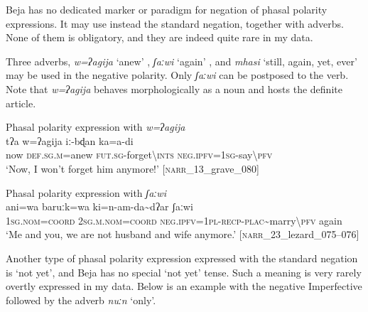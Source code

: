 \documentclass[output=paper,colorlinks,citecolor=brown]{langscibook}
\begin{document}

Beja has no dedicated marker or paradigm for negation of phasal polarity expressions. It may use instead the standard negation, together with adverbs. None of them is obligatory, and they are indeed quite rare in my data.

Three adverbs, \textit{w=ʔagija} ‘anew’ , \textit{ʃaːwi} ‘again’ , and \textit{mhasi} ‘still, again, yet, ever’  may be used in the negative polarity. Only \textit{ʃaːwi} can be postposed to the verb. Note that \textit{w=ʔagija} behaves morphologically as a noun and hosts the definite article.

\ea\label{ex:beja:4}
Phasal polarity expression with \textit{w=ʔagija} \\
    \gll tʔa w=ʔagija iː-bɖan ka=a-di\\
         now \textsc{def.sg.m}=anew \textsc{fut.sg}{}-forget{\textbackslash}\textsc{ints} \textsc{neg.ipfv=1sg-}say{\textbackslash}\textsc{pfv}\\
    \glt `Now, I won’t forget him anymore!' [\textsc{narr}\_13\_grave\_080]
\z 

\ea\label{ex:beja:5}
{  Phasal polarity expression with \textit{ʃaːwi}}\\
    \gll ani=wa baruːk=wa ki=n-am-da{\textasciitilde}dʔar ʃaːwi\\
         \textsc{1sg.nom=coord} \textsc{2sg.m.nom=coord} \textsc{neg.ipfv=1pl-recp-plac}{\textasciitilde}marry{\textbackslash}\textsc{pfv} again\\
    \glt `Me and you, we are not husband and wife anymore.' [\textsc{narr}\_23\_lezard\_075–076]
\z


Another type of phasal polarity expression expressed with the standard negation is ‘not yet’, and Beja has no special ‘not yet’ tense. Such a meaning is very rarely overtly expressed in my data. Below  is an example with the negative Imperfective followed by the adverb \textit{nuːn} ‘only’.
\end{document}
